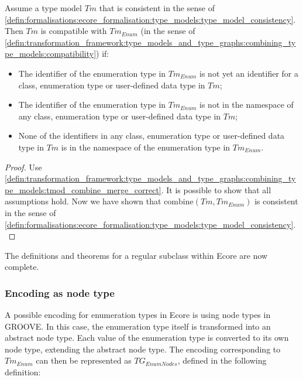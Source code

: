 \begin{thm}
\label{defin:library_of_transformations:type_level_transformations:enumeration_types:tmod_enum_combine_correct}
Assume a type model $Tm$ that is consistent in the sense of \cref{defin:formalisations:ecore_formalisation:type_models:type_model_consistency}. Then $Tm$ is compatible with $Tm_{Enum}$ (in the sense of \cref{defin:transformation_framework:type_models_and_type_graphs:combining_type_models:compatibility}) if:
\begin{itemize}
    \item The identifier of the enumeration type in $Tm_{Enum}$ is not yet an identifier for a class, enumeration type or user-defined data type in $Tm$;
    \item The identifier of the enumeration type in $Tm_{Enum}$ is not in the namespace of any class, enumeration type or user-defined data type in $Tm$;
    \item None of the identifiers in any class, enumeration type or user-defined data type in $Tm$ is in the namespace of the enumeration type in $Tm_{Enum}$.
\end{itemize}
\end{thm}

\begin{proof}
Use \cref{defin:transformation_framework:type_models_and_type_graphs:combining_type_models:tmod_combine_merge_correct}. It is possible to show that all assumptions hold. Now we have shown that $\mathrm{combine}(Tm, Tm_{Enum})$ is consistent in the sense of \cref{defin:formalisations:ecore_formalisation:type_models:type_model_consistency}.
\end{proof}

The definitions and theorems for a regular subclass within Ecore are now complete. 

\subsubsection{Encoding as node type}

A possible encoding for enumeration types in Ecore is using node types in GROOVE. In this case, the enumeration type itself is transformed into an abstract node type. Each value of the enumeration type is converted to its own node type, extending the abstract node type. The encoding corresponding to $Tm_{Enum}$ can then be represented as $TG_{EnumNodes}$, defined in the following definition:

